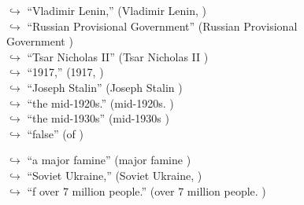 \documentclass[11pt,a4paper, onecolumn]{article}
\begin{document}
\begin{figure}[t] \small \begin{tcolorbox}[boxsep=0pt,left=5pt,right=0pt,top=2pt,colback = yellow!5] \begin{dialogue}
 \small 
\colorbox{pink!25}{$\hookrightarrow$}
{ ``Vladimir Lenin,'' (Vladimir Lenin, ) }
\\
\colorbox{pink!25}{$\hookrightarrow$}
{ ``Russian Provisional Government'' (Russian Provisional Government ) }
\\
\colorbox{pink!25}{$\hookrightarrow$}
{ ``Tsar Nicholas II'' (Tsar Nicholas II ) }
\\
\colorbox{pink!25}{$\hookrightarrow$}
{ ``1917,'' (1917, ) }
\\
\colorbox{pink!25}{$\hookrightarrow$}
{ ``Joseph Stalin'' (Joseph Stalin ) }
\\
\colorbox{pink!25}{$\hookrightarrow$}
{ ``the mid-1920s.'' (mid-1920s. ) }
\\
\colorbox{pink!25}{$\hookrightarrow$}
{ ``the mid-1930s'' (mid-1930s ) }
\\
\colorbox{pink!25}{$\hookrightarrow$}
{ ``false'' (of ) }
 \end{dialogue}\end{tcolorbox}\end{figure}\begin{figure}[t] \small \begin{tcolorbox}[boxsep=0pt,left=5pt,right=0pt,top=2pt,colback = yellow!5] \begin{dialogue}
 \small 
\colorbox{pink!25}{$\hookrightarrow$}
{ ``a major famine'' (major famine ) }
\\
\colorbox{pink!25}{$\hookrightarrow$}
{ ``Soviet Ukraine,'' (Soviet Ukraine, ) }
\\
\colorbox{pink!25}{$\hookrightarrow$}
{ ``f over 7 million people.'' (over 7 million people. ) }

\end{dialogue}
\end{tcolorbox}
\end{figure}
\end{document}
